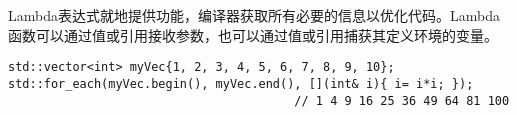 Lambda表达式就地提供功能，编译器获取所有必要的信息以优化代码。Lambda函数可以通过值或引用接收参数，也可以通过值或引用捕获其定义环境的变量。

\begin{lstlisting}[style=styleCXX]
std::vector<int> myVec{1, 2, 3, 4, 5, 6, 7, 8, 9, 10};
std::for_each(myVec.begin(), myVec.end(), [](int& i){ i= i*i; });
                                        // 1 4 9 16 25 36 49 64 81 100
\end{lstlisting}